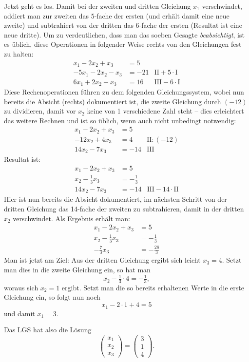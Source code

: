 Jetzt geht es los. Damit bei der zweiten und dritten Gleichung $x_1$ verschwindet, addiert man zur zweiten das 5-fache der ersten (und erhält damit eine neue zweite) und subtrahiert von der dritten das 6-fache der ersten (Resultat ist eine neue dritte). Um zu verdeutlichen, dass man das soeben Gesagte \emph{beabsichtigt}, ist es üblich, diese Operationen in folgender Weise rechts von den Gleichungen fest zu halten:
\begin{align*}
  x_1 - 2x_2 + x_3 &= 5 & \\
  -5x_1 - 2x_2 - x_3 &= -21 & \text{II}+5\cdot\text{I}\\
  6x_1 + 2x_2 - x_3 &= 16 & \text{III}-6\cdot\text{I}
\end{align*}
Diese Rechenoperationen führen zu dem folgenden Gleichungssystem, wobei nun bereits die Absicht (rechts) dokumentiert ist, die zweite Gleichung durch $(-12)$ zu dividieren, damit vor $x_2$ keine von 1 verschiedene Zahl steht -- dies erleichtert das weitere Rechnen und ist so üblich, wenn auch nicht unbedingt notwendig:
\begin{align*}
  x_1 - 2x_2 + x_3 &= 5 & \\
  -12x_2 + 4x_3 &= 4 & \text{II}:(-12)\\
  14x_2 - 7x_3 &= -14 & \text{III}
\end{align*}
Resultat ist:
\begin{align*}
  x_1 - 2x_2 + x_3 &= 5 & \\
  x_2 - \tfrac{1}{3}x_3 &= -\tfrac{1}{3} & \\
  14x_2 - 7x_3 &= -14 & \text{III}-14\cdot\text{II}
\end{align*}
Hier ist nun bereits die Absicht dokumentiert, im nächsten Schritt von der dritten Gleichung das 14-fache der zweiten zu subtrahieren, damit in der dritten $x_2$ verschwindet.
Als Ergebnis erhält man:
\begin{align*}
  x_1 - 2x_2 + x_3 &= 5\\
  x_2 - \tfrac{1}{3}x_3 &= -\tfrac{1}{3}\\
  -\tfrac{7}{3}x_3 &= -\tfrac{28}{3}
\end{align*}
Man ist jetzt am Ziel: Aus der dritten Gleichung ergibt sich leicht $x_3 = 4$. Setzt man dies in die zweite Gleichung ein, so hat man
\[ x_2 - \tfrac{1}{3} \cdot 4 = -\tfrac{1}{3} , \]
woraus sich $x_2 = 1$ ergibt. Setzt man die so bereits erhaltenen Werte in die erste Gleichung ein, so folgt nun noch
\[ x_1 - 2 \cdot 1 + 4 = 5 \]
und damit $x_1 = 3$.

Das LGS hat also die Lösung
\[ \begin{pmatrix} x_1 \\ x_2 \\ x_3 \end{pmatrix} = \begin{pmatrix} 3 \\ 1 \\ 4 \end{pmatrix} . \]


